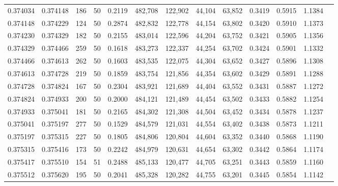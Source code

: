 \begin{tabular}{rrrrrrrrrrrrr}
0.374034 & 0.374148 &   186 &  50 &                                     0.2119 & 482,708 & 122,902 &  44,104 &  63,852 & 0.3419 & 0.5915 & 1.1384 \\
0.374148 & 0.374229 &   124 &  50 &                                     0.2874 & 482,832 & 122,778 &  44,154 &  63,802 & 0.3420 & 0.5910 & 1.1373 \\
0.374230 & 0.374329 &   182 &  50 &                                     0.2155 & 483,014 & 122,596 &  44,204 &  63,752 & 0.3421 & 0.5905 & 1.1356 \\
0.374329 & 0.374466 &   259 &  50 &                                     0.1618 & 483,273 & 122,337 &  44,254 &  63,702 & 0.3424 & 0.5901 & 1.1332 \\
0.374466 & 0.374613 &   262 &  50 &                                     0.1603 & 483,535 & 122,075 &  44,304 &  63,652 & 0.3427 & 0.5896 & 1.1308 \\
0.374613 & 0.374728 &   219 &  50 &                                     0.1859 & 483,754 & 121,856 &  44,354 &  63,602 & 0.3429 & 0.5891 & 1.1288 \\
0.374728 & 0.374824 &   167 &  50 &                                     0.2304 & 483,921 & 121,689 &  44,404 &  63,552 & 0.3431 & 0.5887 & 1.1272 \\
0.374824 & 0.374933 &   200 &  50 &                                     0.2000 & 484,121 & 121,489 &  44,454 &  63,502 & 0.3433 & 0.5882 & 1.1254 \\
0.374933 & 0.375041 &   181 &  50 &                                     0.2165 & 484,302 & 121,308 &  44,504 &  63,452 & 0.3434 & 0.5878 & 1.1237 \\
0.375041 & 0.375197 &   277 &  50 &                                     0.1529 & 484,579 & 121,031 &  44,554 &  63,402 & 0.3438 & 0.5873 & 1.1211 \\
0.375197 & 0.375315 &   227 &  50 &                                     0.1805 & 484,806 & 120,804 &  44,604 &  63,352 & 0.3440 & 0.5868 & 1.1190 \\
0.375315 & 0.375416 &   173 &  50 &                                     0.2242 & 484,979 & 120,631 &  44,654 &  63,302 & 0.3442 & 0.5864 & 1.1174 \\
0.375417 & 0.375510 &   154 &  51 &                                     0.2488 & 485,133 & 120,477 &  44,705 &  63,251 & 0.3443 & 0.5859 & 1.1160 \\
0.375512 & 0.375620 &   195 &  50 &                                     0.2041 & 485,328 & 120,282 &  44,755 &  63,201 & 0.3445 & 0.5854 & 1.1142 \\

\end{tabular}
